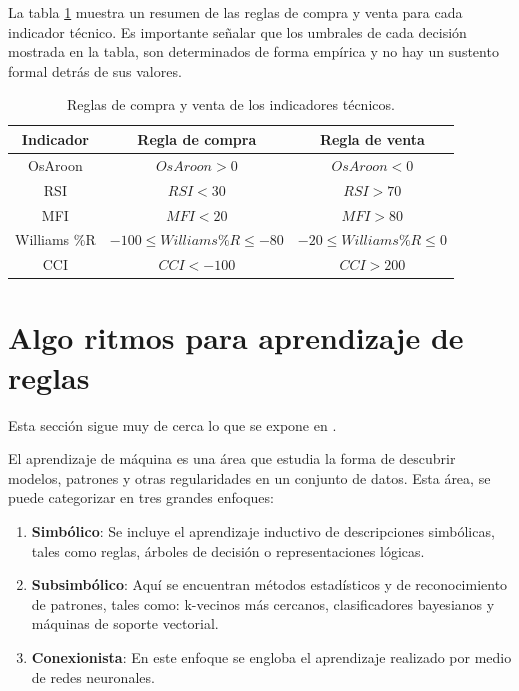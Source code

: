\documentclass[12pt]{report}
\theoremstyle{break}
\theoremstyle{break}
\begin{document}
La tabla \ref{tabla:resumen reglas indicadores} muestra un resumen de las reglas de compra y venta para cada indicador técnico. Es importante señalar que los umbrales de cada decisión mostrada en la tabla, son determinados de forma empírica y no hay un sustento formal detrás de sus valores.
\begin{table}[h]
\centering
\begin{tabular}{ccc}
\hline
\textbf{Indicador} & \textbf{Regla de compra} & \textbf{Regla de  venta} \\
\hline
OsAroon & $OsAroon>0$ & $OsAroon<0$ \\
RSI & $RSI < 30$ & $RSI > 70$ \\
MFI & $MFI < 20$ & $MFI > 80$ \\
Williams \%R & $-100 \leq Williams \%R \leq -80 $ & $-20 \leq Williams \%R \leq 0$ \\
CCI & $CCI < -100$ & $CCI > 200$ \\

\hline
\end{tabular}
\caption{\label{tabla:resumen reglas indicadores} Reglas de compra y venta de los indicadores técnicos.}
\end{table}

\section{Algo ritmos para aprendizaje de reglas}
\label{seccion:algoritmos-aprendizaje-reglas}
Esta sección sigue muy de cerca lo que se expone en \cite{foundations-rule}.

El aprendizaje de máquina es una área que estudia la forma de descubrir modelos, patrones y otras regularidades en un conjunto de datos. Esta área, se puede categorizar en tres grandes enfoques:

\begin{enumerate}
\item \textbf{Simbólico}: Se incluye el aprendizaje inductivo de descripciones simbólicas, tales como reglas, árboles de decisión o representaciones lógicas.

\item \textbf{Subsimbólico}: Aquí se encuentran métodos estadísticos y de reconocimiento de patrones, tales como: k-vecinos más cercanos, clasificadores bayesianos y máquinas de soporte vectorial.

\item \textbf{Conexionista}: En este enfoque se engloba el aprendizaje realizado por medio de redes neuronales.
\end{enumerate}
\end{document}
